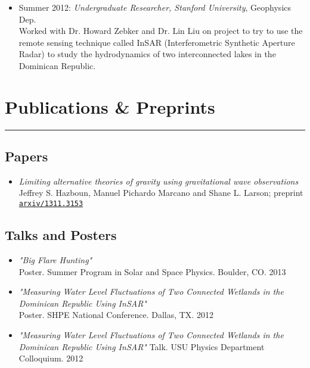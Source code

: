 \documentclass[letterpaper,10pt]{article}
\begin{document}
\begin{itemize}[label=$\blacktriangleright$]
  \item Summer 2012: \emph{Undergraduate Researcher, Stanford University}, Geophysics Dep.\ \\
Worked with Dr. Howard Zebker and Dr. Lin Liu on project to try to use the remote sensing technique called InSAR (Interferometric Synthetic Aperture Radar) to study the hydrodynamics of two interconnected lakes in the Dominican Republic. 
  \end{itemize}

\section*{Publications \& Preprints}
\hrule
\vspace{.3 cm}
\subsection*{Papers}
\begin{itemize}[label=$\blacktriangleright$]
\item  \emph{Limiting alternative theories of gravity using gravitational wave observations} \\
Jeffrey S. Hazboun, Manuel Pichardo Marcano and Shane L. Larson; preprint \href{http://arxiv.org/abs/1311.3153}{\tt arxiv/1311.3153} \\


\end{itemize}

\subsection*{Talks and Posters}

\begin{itemize}[label=$\blacktriangleright$]

\item \textit{"Big Flare Hunting"} \\Poster. Summer Program in Solar and Space Physics. Boulder, CO. 2013


\item \textit{"Measuring Water Level Fluctuations of Two Connected Wetlands in the Dominican Republic Using InSAR"} \\Poster. SHPE National Conference. Dallas, TX. 2012

\item \emph{"Measuring Water Level Fluctuations of Two Connected Wetlands in the Dominican Republic Using InSAR"}
Talk. USU Physics Department Colloquium. 2012
\end{itemize}
\end{document}
